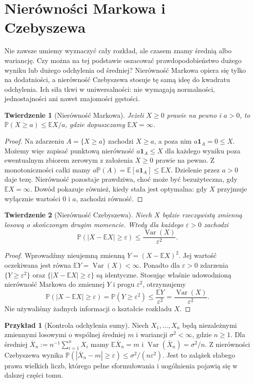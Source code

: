 \documentclass[11pt,a4paper,oneside]{report}
\numberwithin{equation}{chapter}
\theoremstyle{plain}
\newtheorem{twierdzenie}{Twierdzenie}[chapter]
\theoremstyle{definition}
\newtheorem{przyklad}{Przykład}[chapter]
\theoremstyle{remark}
\newcommand{\Prob}{\mathbb{P}}
\newcommand{\E}{\mathbb{E}}
\newcommand{\Var}{\operatorname{Var}}
\newcommand{\ind}[1]{\mathbf{1}_{#1}}
\begin{document}
\section{Nierówności Markowa i Czebyszewa}
Nie zawsze umiemy wyznaczyć cały rozkład, ale czasem znamy
średnią albo wariancję. Czy można na tej podstawie oszacować
prawdopodobieństwo dużego wyniku lub dużego odchylenia od średniej?
Nierówność Markowa opiera się tylko na dodatniości, a nierówność
Czebyszewa stosuje tę samą ideę do kwadratu odchylenia.
Ich siła tkwi w uniwersalności: nie wymagają normalności,
jednostajności ani nawet znajomości gęstości.

\begin{twierdzenie}[Nierówność Markowa]
Jeżeli $X\geq0$ prawie na pewno i $a>0$, to
$\Prob(X\geq a)\leq\E X/a$, gdzie dopuszczamy $\E X=\infty$.
\end{twierdzenie}
\begin{proof}
Na zdarzeniu $A=\{X\geq a\}$ zachodzi $X\geq a$,
a poza nim $a\ind A=0\leq X$.
Możemy więc zapisać punktową nierówność
$a\ind A\leq X$ dla każdego wyniku poza ewentualnym
zbiorem zerowym z założenia $X\geq0$ prawie na pewno.
Z monotoniczności całki mamy
$a\Prob(A)=\E[a\ind A]\leq\E X$.
Dzielenie przez $a>0$ daje tezę. Nierówność pozostaje
prawdziwa, choć może być bezużyteczna, gdy $\E X=\infty$.
Dowód pokazuje również, kiedy stała jest optymalna:
gdy $X$ przyjmuje wyłącznie wartości $0$ i $a$,
zachodzi równość.
\end{proof}

\begin{twierdzenie}[Nierówność Czebyszewa]
Niech $X$ będzie rzeczywistą zmienną losową o skończonym
drugim momencie. Wtedy dla każdego $\varepsilon>0$ zachodzi
\[
\Prob(|X-\E X|\geq\varepsilon)
\leq\frac{\Var(X)}{\varepsilon^2}.
\]
\end{twierdzenie}
\begin{proof}
Wprowadźmy nieujemną zmienną
$Y=(X-\E X)^2$. Jej wartość oczekiwana jest równa
$\E Y=\Var(X)<\infty$. Ponadto dla $\varepsilon>0$
zdarzenia
$\{Y\geq\varepsilon^2\}$ oraz
$\{|X-\E X|\geq\varepsilon\}$ są identyczne.
Stosując właśnie udowodnioną nierówność Markowa
do zmiennej $Y$ i progu $\varepsilon^2$, otrzymujemy
\[
\Prob(|X-\E X|\geq\varepsilon)
=\Prob(Y\geq\varepsilon^2)
\leq\frac{\E Y}{\varepsilon^2}
=\frac{\Var(X)}{\varepsilon^2}.
\]
Nie używaliśmy żadnych informacji o kształcie rozkładu $X$.
\end{proof}

\begin{przyklad}[Kontrola odchylenia sumy]
Niech $X_1,\ldots,X_n$ będą niezależnymi zmiennymi losowymi
o wspólnej średniej $m$ i wariancji $\sigma^2<\infty$,
gdzie $n\geq1$. Dla średniej $\overline X_n:=n^{-1}\sum_{i=1}^nX_i$
mamy $\E\overline X_n=m$ i $\Var(\overline X_n)=\sigma^2/n$.
Z nierówności Czebyszewa wynika
$\Prob(|\overline X_n-m|\geq\varepsilon)
\leq\sigma^2/(n\varepsilon^2)$.
Jest to zalążek słabego prawa wielkich liczb, którego
pełne sformułowania i uogólnienia pojawią się w dalszej części tomu.
\end{przyklad}
\end{document}
